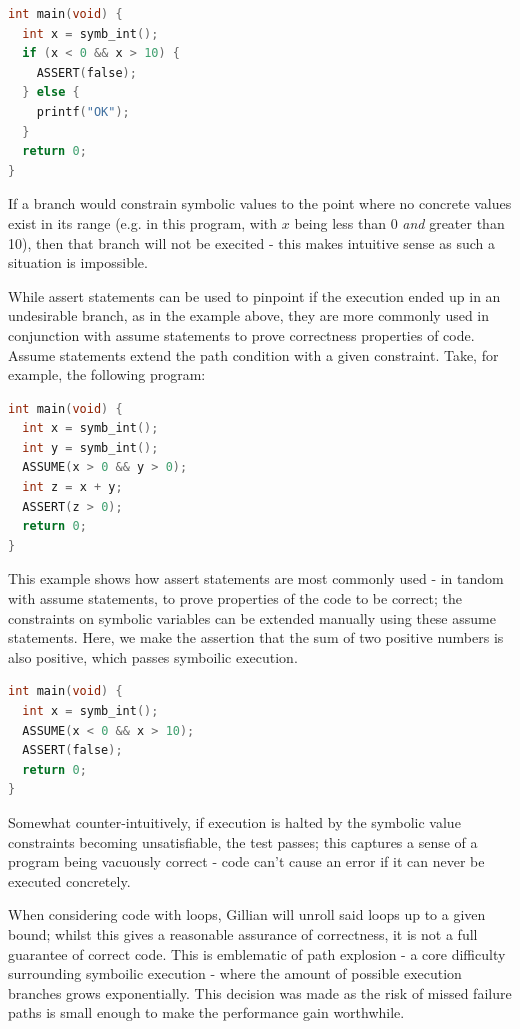 \begin{lstlisting}[caption={Symbolic execution - non-executed branches}, style=code, language=C]
int main(void) {
  int x = symb_int();
  if (x < 0 && x > 10) {
    ASSERT(false);
  } else {
    printf("OK");
  }
  return 0;
}
\end{lstlisting}

If a branch would constrain symbolic values to the point where no concrete values exist in its range (e.g. in this program, with $x$ being less than 0 \textit{and} greater than 10), then that branch will not be execited - this makes intuitive sense as such a situation is impossible.

While assert statements can be used to pinpoint if the execution ended up in an undesirable branch, as in the example above, they are more commonly used in conjunction with assume statements to prove correctness properties of code. Assume statements extend the path condition with a given constraint. Take, for example, the following program:

\begin{lstlisting}[caption={Symbolic execution - assume and assert}, style=code, language=C]
int main(void) {
  int x = symb_int();
  int y = symb_int();
  ASSUME(x > 0 && y > 0);
  int z = x + y;
  ASSERT(z > 0);
  return 0;
}
\end{lstlisting}

This example shows how assert statements are most commonly used - in tandom with assume statements, to prove properties of the code to be correct; the constraints on symbolic variables can be extended manually using these assume statements. Here, we make the assertion that the sum of two positive numbers is also positive, which passes symboilic execution.

\begin{lstlisting}[caption={Symbolic execution - termination when unsatisfiable}, style=code, language=C]
int main(void) {
  int x = symb_int();
  ASSUME(x < 0 && x > 10);
  ASSERT(false);
  return 0;
}
\end{lstlisting}

Somewhat counter-intuitively, if execution is halted by the symbolic value
constraints becoming unsatisfiable, the test passes; this captures a sense of
a program being vacuously correct - code can't cause an error if it can never
be executed concretely.

When considering code with loops, Gillian will unroll said loops up to a given bound; whilst this gives a reasonable assurance of correctness, it is not a full guarantee of correct code. This is emblematic of path explosion - a core difficulty surrounding symboilic execution - where the amount of possible execution branches grows exponentially. This decision was made as the risk of missed failure paths is small enough to make the performance gain worthwhile.

